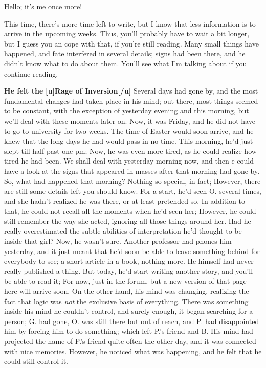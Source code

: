 Hello; it's me once more!

This time, there's more time left to write, but I know that less information is to arrive in the upcoming weeks. Thus, you'll probably have to wait a bit longer, but I guess you an cope with that, if you're still reading. 
Many small things have happened, and fate interfered in several details; signs had been there, and he didn't know what to do about them. You'll see what I'm talking about if you continue reading. 

\textbf{He felt the}
\textbf{[u]Rage of Inversion[/u]}
Several days had gone by, and the most fundamental changes had taken place in his mind; out there, most things seemed to be constant, with the exception of yesterday evening and this morning, but we'll deal with these moments later on. 
Now, it was Friday, and he did not have to go to university for two weeks. The time of Easter would soon arrive, and he knew that the long days he had would pass in no time. This morning, he'd just slept till half past one pm; Now, he was even more tired, as he could realize how tired he had been. We shall deal with yesterday morning  now, and then e could have a look at the signs that appeared in masses after that morning had gone by. 
So, what had happened that morning? Nothing so special, in fact; However, there are still some details left you should know. For a start, he'd seen O. several times, and she hadn't realized he was there, or at least pretended so. In addition to that, he could not recall all the moments when he'd seen her; However, he could still remember the way she acted, ignoring all those things around her. Had he really overestimated the subtle abilities of interpretation he'd thought to be inside that girl?
Now, he wasn't sure. Another professor had phones him yesterday, and it just meant that he'd soon be able to leave something behind for everybody to see; a short article in a book, nothing more. He himself had never really published a thing. 
But today, he'd start writing another story, and you'll be able to read it; For now, just in the forum, but a new version of that page here will arrive soon. 
On the other hand, his mind was changing, realizing the fact that logic was \emph{not} the exclusive basis of everything. There was something inside his mind he couldn't control, and surely enough, it began searching for a person; G. had gone, O. was still there but out of reach, and P. had disappointed him by forcing him to do something; which left P.'s friend and B. His mind had projected the name of P.'s friend quite often the other day, and it was connected with nice memories. However, he noticed what was happening, and he felt that he could still control it. 
